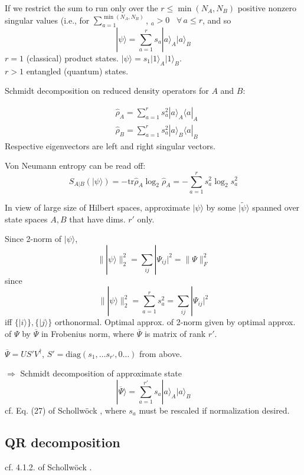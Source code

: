 \documentclass[10pt]{amsart}
\begin{document}
\begin{multicols*}{2}
If we restrict the sum to run only over the $r\leq \min{(N_A,N_B)}$ positive nonzero singular values (i.e., for $\sum_{a=1}^{\min{(N_A,N_B)}}$, $_a>0$ \, $\forall \, a \leq r$, and so 
\[
|\psi \rangle =\sum_{a=1}^r s_a |a\rangle_A |a\rangle_B
\]
$r=1$ (classical) product states.  $|\psi \rangle = s_1 |1\rangle_A |1\rangle_B$.  \\
$r>1$ entangled (quantum) states.  

Schmidt decomposition on reduced density operators for $A$ and $B$:  

\[
\begin{aligned}
	& \widehat{\rho}_A =\sum_{a=1}^r s_a^2 |a\rangle_A \langle a |_A \\ 
	& \widehat{\rho}_B = \sum_{a=1}^r s_a^2 |a\rangle_B \langle a |_B
\end{aligned}
\]
Respective eigenvectors are left and right singular vectors.  

Von Neumann entropy can be read off:  
\[
S_{A|B}(|\psi \rangle) = -\text{tr}\widehat{\rho}_A \log_2{\widehat{\rho}_A} = -\sum_{a=1}^r s_a^2 \log_2{s_a^2}
\]

In view of large size of Hilbert spaces, approximate $| \psi \rangle$ by some $| \widetilde{\psi} \rangle$ spanned over state spaces $A,B$ that have dims. $r'$ only.  

Since 2-norm of $| \psi \rangle$, 
\[
\| | \psi\rangle \|_2^2 = \sum_{ij} |\Psi_{ij} |^2 = \| \Psi \|^2_F
\]
since
\[
\| | \psi\rangle \|_2^2 = \sum_{a=1}^r s_a^2 = \sum_{ij} |\Psi_{ij} |^2
\] 
iff $\lbrace |i \rangle \rbrace , \lbrace | j  \rangle \rbrace$ orthonormal.  Optimal approx. of 2-norm given by optimal approx. of $\Psi$ by $\overline{\Psi}$ in Frobenius norm, where $\overline{\Psi}$ is matrix of rank $r'$.  

$\overline{\Psi} = US'V^{\dag}$, $S' =\text{diag}(s_1 , \dots s_{r'} , 0\dots )$ from above. 

$\Longrightarrow $ Schmidt decomposition of approximate state 
\begin{equation}
| \overline{\Psi}\rangle = \sum_{a=1}^{r'} s_a|a\rangle_A | a \rangle_B
\end{equation}
cf. Eq. (27) of  Schollw\"{o}ck \cite{Scho2010}, where $s_a$ must be rescaled if normalization desired.  

\subsection{QR decomposition}
cf. 4.1.2. of  Schollw\"{o}ck \cite{Scho2010}.  


\end{multicols*}
\end{document}
